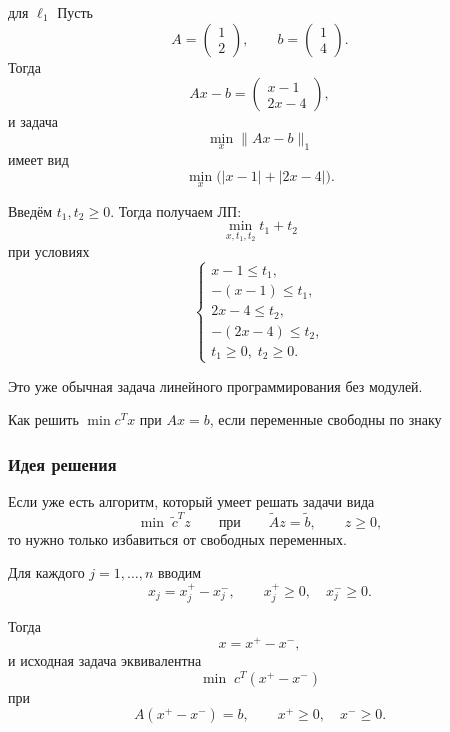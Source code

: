 	\begin{Example}{ для \texorpdfstring{$\ell_1$}{l1}}{}
	Пусть
	\[
	A=
	\begin{pmatrix}
		1\\
		2
	\end{pmatrix},
	\qquad
	b=
	\begin{pmatrix}
		1\\
		4
	\end{pmatrix}.
	\]
	Тогда
	\[
	Ax-b=
	\begin{pmatrix}
		x-1\\
		2x-4
	\end{pmatrix},
	\]
	и задача
	\[
	\min_x \|Ax-b\|_1
	\]
	имеет вид
	\[
	\min_x \bigl(|x-1|+|2x-4|\bigr).
	\]
	
	Введём \(t_1,t_2 \ge 0\). Тогда получаем ЛП:
	\[
	\min_{x,t_1,t_2} t_1+t_2
	\]
	при условиях
	\[
	\begin{cases}
		x-1 \le t_1,\\
		-(x-1) \le t_1,\\
		2x-4 \le t_2,\\
		-(2x-4) \le t_2,\\
		t_1 \ge 0,\; t_2 \ge 0.
	\end{cases}
	\]
	
	Это уже обычная задача линейного программирования без модулей.
	\end{Example}
	
	\begin{Proposition}{}{}
		Как решить \texorpdfstring{$\min c^T x$}{min cTx} при \texorpdfstring{$Ax=b$}{Ax=b}, если переменные свободны по знаку	
	\end{Proposition}
	
	\subsubsection*{Идея решения}
	
	Если уже есть алгоритм, который умеет решать задачи вида
	\[
	\min \; \tilde c^T z
	\qquad \text{при} \qquad
	\tilde A z=\tilde b,\qquad z \ge 0,
	\]
	то нужно только избавиться от свободных переменных.
	
	Для каждого \(j=1,\dots,n\) вводим
	\[
	x_j=x_j^+-x_j^-,
	\qquad
	x_j^+ \ge 0,\quad x_j^- \ge 0.
	\]
	
	Тогда
	\[
	x=x^+-x^-,
	\]
	и исходная задача эквивалентна
	\[
	\min \; c^T(x^+-x^-)
	\]
	при
	\[
	A(x^+-x^-)=b,
	\qquad
	x^+ \ge 0,\quad x^- \ge 0.
	\]
	
